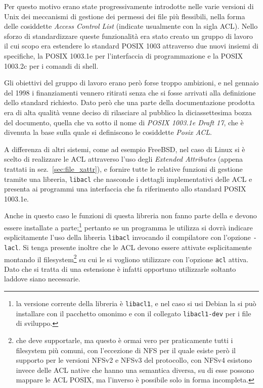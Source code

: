 Per questo motivo erano state progressivamente introdotte nelle varie versioni
di Unix dei meccanismi di gestione dei permessi dei file più flessibili, nella
forma delle cosiddette \textit{Access Control List} (indicate usualmente con
la sigla ACL).  Nello sforzo di standardizzare queste funzionalità era stato
creato un gruppo di lavoro il cui scopo era estendere lo standard POSIX 1003
attraverso due nuovi insiemi di specifiche, la POSIX 1003.1e per l'interfaccia
di programmazione e la POSIX 1003.2c per i comandi di shell.

Gli obiettivi del gruppo di lavoro erano però forse troppo ambizioni, e nel
gennaio del 1998 i finanziamenti vennero ritirati senza che si fosse arrivati
alla definizione dello standard richiesto. Dato però che una parte della
documentazione prodotta era di alta qualità venne deciso di rilasciare al
pubblico la diciassettesima bozza del documento, quella che va sotto il nome
di \textit{POSIX 1003.1e Draft 17}, che è divenuta la base sulla quale si
definiscono le cosiddette \textit{Posix ACL}.

A differenza di altri sistemi, come ad esempio FreeBSD, nel caso di Linux si è
scelto di realizzare le ACL attraverso l'uso degli \textit{Extended
  Attributes} (appena trattati in sez.~\ref{sec:file_xattr}), e fornire tutte
le relative funzioni di gestione tramite una libreria, \texttt{libacl} che
nasconde i dettagli implementativi delle ACL e presenta ai programmi una
interfaccia che fa riferimento allo standard POSIX 1003.1e.

Anche in questo caso le funzioni di questa libreria non fanno parte della
 e devono essere installate a parte;\footnote{la versione corrente
  della libreria è \texttt{libacl1}, e nel caso si usi Debian la si può
  installare con il pacchetto omonimo e con il collegato \texttt{libacl1-dev}
  per i file di sviluppo.}  pertanto se un programma le utilizza si dovrà
indicare esplicitamente l'uso della libreria \texttt{libacl} invocando il
compilatore con l'opzione \texttt{-lacl}. Si tenga presente inoltre che le ACL
devono essere attivate esplicitamente montando il filesystem\footnote{che deve
  supportarle, ma questo è ormai vero per praticamente tutti i filesystem più
  comuni, con l'eccezione di NFS per il quale esiste però il supporto per le
  versioni NFSv2 e NFSv3 del protocollo, con NFSv4 esistono invece delle ACL
  native che hanno una semantica diversa, su di esse possono mappare le ACL
  POSIX, ma l'inverso è possibile solo in forma incompleta.} su cui le si
vogliono utilizzare con l'opzione \texttt{acl} attiva. Dato che si tratta di
una estensione è infatti opportuno utilizzarle soltanto laddove siano
necessarie.

